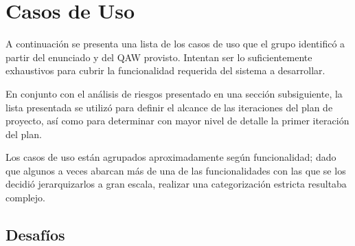 \section{Casos de Uso}
\label{sec:casosdeuso}
A continuación se presenta una lista de los casos de uso que el grupo identificó a partir del enunciado y del QAW provisto. Intentan ser lo suficientemente exhaustivos para cubrir la funcionalidad requerida del sistema a desarrollar.

En conjunto con el análisis de riesgos presentado en una sección subsiguiente, la lista presentada se utilizó para definir el alcance de las iteraciones del plan de proyecto, así como para determinar con mayor nivel de detalle la primer iteración del plan.

Los casos de uso están agrupados aproximadamente según funcionalidad; dado que algunos a veces abarcan más de una de las funcionalidades con las que se los decidió jerarquizarlos a gran escala, realizar una categorización estricta resultaba complejo.




\subsection{Desafíos}
